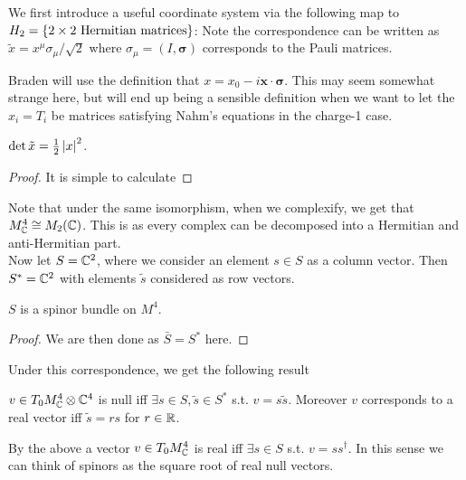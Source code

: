 \documentclass{article}
\begin{document}
We first introduce a useful coordinate system via the following map to $H_2 = \left\{ \text{$2\times 2$ Hermitian matrices} \right\}$:
Note the correspondence can be written as $\tilde{x} = x^\mu \sigma_\mu/\sqrt{2}$ where $\sigma_\mu = (I,\bm{\sigma})$ corresponds to the Pauli matrices.

\begin{remark}
	Braden will use the definition that $x=x_0-i\bm{x}\cdot\bm{\sigma}$. This may seem somewhat strange here, but will end up being a sensible definition when we want to let the $x_i =T_i$ be matrices satisfying Nahm's equations in the charge-1 case. 
\end{remark}

\begin{prop}
	$\det \tilde{x} = \frac{1}{2} \left\lvert x \right\rvert^2$. 
\end{prop}
\begin{proof}
	 It is simple to calculate 
\end{proof}
Note that under the same isomorphism, when we complexify, we get that $M_{\mathbb{C}}^4 \cong M_2(\mathbb{C})$. This is as every complex can be decomposed into a Hermitian and anti-Hermitian part. \\
Now let $S = \mathbb{C}^2$, where we consider an element $s \in S$ as a column vector. Then $S^\ast = \mathbb{C}^2$ with elements $\tilde{s}$ considered as row vectors. 
\begin{prop}
	$S$ is a spinor bundle on $M^4$. 
\end{prop} 
\begin{proof}
We are then done as $\bar{S} = S^\ast$ here. 
\end{proof}
Under this correspondence, we get the following result
\begin{lemma}
	$v \in T_0M^4_{\mathbb{C}} \otimes \mathbb{C}^4$ is null iff $\exists s\in S, \tilde{s} \in S^\ast$ s.t. $v = s \tilde{s}$. Moreover $v$ corresponds to a real vector iff $\tilde{s} = rs$ for $r \in \mathbb{R}$. 
\end{lemma}
\begin{remark}
	By the above a vector $v \in T_0M^4_{\mathbb{C}}$ is real iff $\exists s \in S$ s.t. $v = ss^\dagger$. In this sense we can think of spinors as the square root of real null vectors. 
\end{remark}
\end{document}
